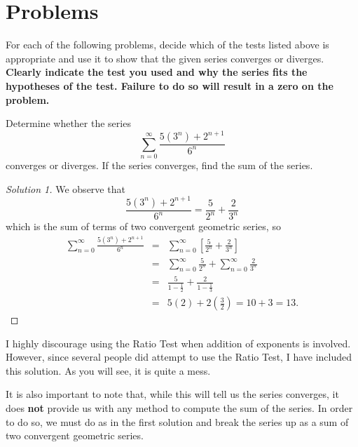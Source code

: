 \documentclass[12pt]{amsart}
\begin{document}
\section{Problems}
\setcounter{thm}{0}
For each of the following problems, decide which of the tests listed above is appropriate and use it to show that the given series converges or diverges.
\textbf{
  Clearly indicate the test you used and why the series fits the hypotheses of the test.
  Failure to do so will result in a zero on the problem.
}

\begin{thm}[5 Points]
  Determine whether the series
  \[\sum_{n = 0}^\infty \frac{5(3^n) + 2^{n+1}}{6^n}\]
  converges or diverges.
  If the series converges, find the sum of the series.
\end{thm}

\begin{proof}[Solution 1]
  We observe that
  \[\frac{5(3^n) + 2^{n+1}}{6^n} = \frac{5}{2^n} + \frac{2}{3^n}\]
  which is the sum of terms of two convergent geometric series, so
  \begin{eqnarray*}
    \sum_{n = 0}^\infty \frac{5(3^n) + 2^{n+1}}{6^n} &=& \sum_{n = 0}^\infty \left[\frac{5}{2^n} + \frac{2}{3^n}\right]\\
    &=& \sum_{n = 0}^\infty \frac{5}{2^n} + \sum_{n = 0}^\infty \frac{2}{3^n}\\
    &=& \frac{5}{1 - \frac{1}{2}} + \frac{2}{1 - \frac{1}{3}}\\
    &=& 5(2) + 2\left(\frac{3}{2}\right) = 10 + 3 = 13.
  \end{eqnarray*}
\end{proof}

\begin{caution}I highly discourage using the Ratio Test when addition of exponents is involved.
However, since several people did attempt to use the Ratio Test, I have included this solution.
As you will see, it is quite a mess.

It is also important to note that, while this will tell us the series converges, it does \textbf{not} provide us with any method to compute the sum of the series.
  In order to do so, we must do as in the first solution and break the series up as a sum of two convergent geometric series.
\end{caution}
\end{document}
